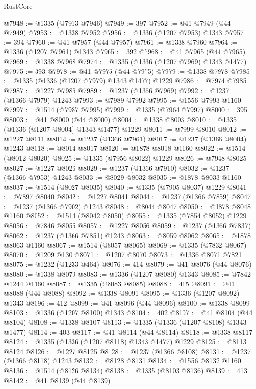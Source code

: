 \begin{lexlean}{RustCore}
\begin{coremodule}
@7948 := @1335 (@7913 @7946)
@7949 := 397
@7952 := @41 @7949 (@44 @7949)
@7953 := @1338 @7952
@7956 := @1336 (@1207 @7953) @1343
@7957 := 394
@7960 := @41 @7957 (@44 @7957)
@7961 := @1338 @7960
@7964 := @1336 (@1207 @7961) @1343
@7965 := 392
@7968 := @41 @7965 (@44 @7965)
@7969 := @1338 @7968
@7974 := @1335 (@1336 (@1207 @7969) @1343 @1477)
@7975 := 393
@7978 := @41 @7975 (@44 @7975)
@7979 := @1338 @7978
@7985 := @1335 (@1336 (@1207 @7979) @1343 @1477) @1229
@7986 := @7974 @7985
@7987 := @1227 @7986
@7989 := @1237 (@1366 @7969)
@7992 := @1237 (@1366 @7979) @1243
@7993 := @7989 @7992
@7995 := @1556 @7993 @1160
@7997 := @1514 (@7987 @7995)
@7999 := @1335 (@7964 @7997)
@8000 := 395
@8003 := @41 @8000 (@44 @8000)
@8004 := @1338 @8003
@8010 := @1335 (@1336 (@1207 @8004) @1343 @1477) @1229
@8011 := @7999 @8010
@8012 := @1227 @8011
@8014 := @1237 (@1366 @7961)
@8017 := @1237 (@1366 @8004) @1243
@8018 := @8014 @8017
@8020 := @1878 @8018 @1160
@8022 := @1514 (@8012 @8020)
@8025 := @1335 (@7956 @8022) @1229
@8026 := @7948 @8025
@8027 := @1227 @8026
@8029 := @1237 (@1366 @7910)
@8032 := @1237 (@1366 @7953) @1243
@8033 := @8029 @8032
@8035 := @1878 @8033 @1160
@8037 := @1514 (@8027 @8035)
@8040 := @1335 (@7905 @8037) @1229
@8041 := @7897 @8040
@8042 := @1227 @8041
@8044 := @1237 (@1366 @7859)
@8047 := @1237 (@1366 @7902) @1243
@8048 := @8044 @8047
@8050 := @1878 @8048 @1160
@8052 := @1514 (@8042 @8050)
@8055 := @1335 (@7854 @8052) @1229
@8056 := @7846 @8055
@8057 := @1227 @8056
@8059 := @1237 (@1366 @7837)
@8062 := @1237 (@1366 @7851) @1243
@8063 := @8059 @8062
@8065 := @1878 @8063 @1160
@8067 := @1514 (@8057 @8065)
@8069 := @1335 (@7832 @8067)
@8070 := @1209 @130
@8071 := @1207 @8070
@8073 := @1336 @8071 @7821
@8075 := @1232 (@1233 @464)
@8076 := 414
@8079 := @41 @8076 (@44 @8076)
@8080 := @1338 @8079
@8083 := @1336 (@1207 @8080) @1343
@8085 := @7842 @1244 @1160
@8087 := @1335 (@8083 @8085)
@8088 := 415
@8091 := @41 @8088 (@44 @8088)
@8092 := @1338 @8091
@8095 := @1336 (@1207 @8092) @1343
@8096 := 412
@8099 := @41 @8096 (@44 @8096)
@8100 := @1338 @8099
@8103 := @1336 (@1207 @8100) @1343
@8104 := 402
@8107 := @41 @8104 (@44 @8104)
@8108 := @1338 @8107
@8113 := @1335 (@1336 (@1207 @8108) @1343 @1477)
@8114 := 403
@8117 := @41 @8114 (@44 @8114)
@8118 := @1338 @8117
@8124 := @1335 (@1336 (@1207 @8118) @1343 @1477) @1229
@8125 := @8113 @8124
@8126 := @1227 @8125
@8128 := @1237 (@1366 @8108)
@8131 := @1237 (@1366 @8118) @1243
@8132 := @8128 @8131
@8134 := @1556 @8132 @1160
@8136 := @1514 (@8126 @8134)
@8138 := @1335 (@8103 @8136)
@8139 := 413
@8142 := @41 @8139 (@44 @8139)

\end{coremodule}
\end{lexlean}
